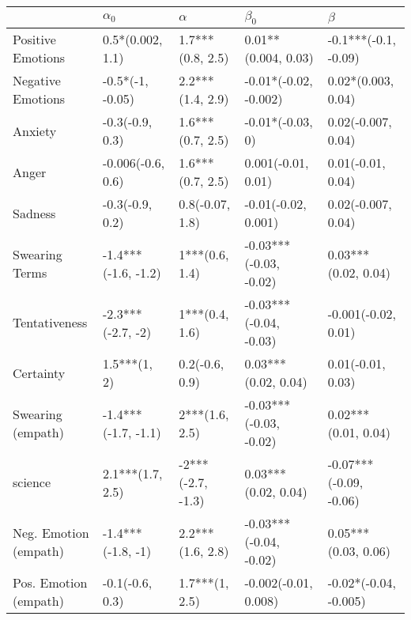 \begin{tabular}{lllll}
\toprule
{} &           $\alpha_0$ &           $\alpha$ &               $\beta_0$ &                 $\beta$ \\
\midrule
Positive Emotions     &     0.5*(0.002, 1.1) &   1.7***(0.8, 2.5) &     0.01**(0.004, 0.03) &    -0.1***(-0.1, -0.09) \\
Negative Emotions     &     -0.5*(-1, -0.05) &   2.2***(1.4, 2.9) &   -0.01*(-0.02, -0.002) &      0.02*(0.003, 0.04) \\
Anxiety               &      -0.3(-0.9, 0.3) &   1.6***(0.7, 2.5) &        -0.01*(-0.03, 0) &      0.02(-0.007, 0.04) \\
Anger                 &    -0.006(-0.6, 0.6) &   1.6***(0.7, 2.5) &      0.001(-0.01, 0.01) &       0.01(-0.01, 0.04) \\
Sadness               &      -0.3(-0.9, 0.2) &    0.8(-0.07, 1.8) &     -0.01(-0.02, 0.001) &      0.02(-0.007, 0.04) \\
Swearing Terms        &  -1.4***(-1.6, -1.2) &     1***(0.6, 1.4) &  -0.03***(-0.03, -0.02) &     0.03***(0.02, 0.04) \\
Tentativeness         &    -2.3***(-2.7, -2) &     1***(0.4, 1.6) &  -0.03***(-0.04, -0.03) &     -0.001(-0.02, 0.01) \\
Certainty             &         1.5***(1, 2) &     0.2(-0.6, 0.9) &     0.03***(0.02, 0.04) &       0.01(-0.01, 0.03) \\
Swearing (empath)     &  -1.4***(-1.7, -1.1) &     2***(1.6, 2.5) &  -0.03***(-0.03, -0.02) &     0.02***(0.01, 0.04) \\
science               &     2.1***(1.7, 2.5) &  -2***(-2.7, -1.3) &     0.03***(0.02, 0.04) &  -0.07***(-0.09, -0.06) \\
Neg. Emotion (empath) &    -1.4***(-1.8, -1) &   2.2***(1.6, 2.8) &  -0.03***(-0.04, -0.02) &     0.05***(0.03, 0.06) \\
Pos. Emotion (empath) &      -0.1(-0.6, 0.3) &     1.7***(1, 2.5) &    -0.002(-0.01, 0.008) &   -0.02*(-0.04, -0.005) \\
\bottomrule
\end{tabular}
